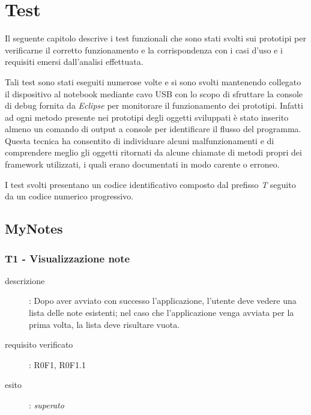\chapter{Test}\label{ch:test}
Il seguente capitolo descrive i test funzionali che sono stati svolti sui prototipi per verificarne il corretto funzionamento e la corrispondenza con i casi d'uso e i requisiti emersi dall'analisi effettuata.

Tali test sono stati eseguiti numerose volte e si sono svolti mantenendo collegato il dispositivo al notebook mediante cavo USB con lo scopo di sfruttare la console di debug fornita da \emph{Eclipse} per monitorare il funzionamento dei prototipi.
Infatti ad ogni metodo presente nei prototipi degli oggetti sviluppati è stato inserito almeno un comando di output a console per identificare il flusso del programma.
Questa tecnica ha consentito di individuare alcuni malfunzionamenti e di comprendere meglio gli oggetti ritornati da alcune chiamate di metodi propri dei framework utilizzati, i quali erano documentati in modo carente o erroneo.

I test svolti presentano un codice identificativo composto dal prefisso \emph{T} seguito da un codice numerico progressivo.

\section{MyNotes}
\subsection{T1 - Visualizzazione note}
\begin{description}
\item[descrizione]: Dopo aver avviato con successo l'applicazione, l'utente deve vedere una lista delle note esistenti; nel caso che l'applicazione venga avviata per la prima volta, la lista deve risultare vuota.
\item[requisito verificato]: R0F1, R0F1.1
\item[esito]: \emph{superato}
\end{description}

